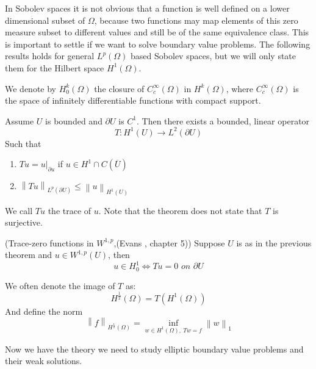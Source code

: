 \documentclass[../Main/main.tex]{subfiles}
\begin{document}
	In Sobolev spaces it is not obvious that a function is well defined on a lower dimensional subset of $\Omega$, because two functions may map elements of this zero measure subset to different values and still be of the same equivalence class. This is important to settle if we want to solve boundary value problems. The following results holds for general $L^p(\Omega)$ based Sobolev spaces, but we will only state them for the Hilbert space $H^1(\Omega)$.
	\begin{definition}
		We denote by $H_0^{k}(\Omega)$ the closure of $C_c^{\infty}(\Omega)$ in $H^{k}(\Omega)$, where $C_c^{\infty}(\Omega)$ is the space of infinitely differentiable functions with compact support.
	\end{definition}
	\begin{theorem}
		Assume $U$ is bounded and $\partial U$ is $C^1$. Then there exists a bounded, linear operator
		\begin{equation*}
			T: H^{1}(U) \rightarrow L^2(\partial U)
		\end{equation*}
		Such that
		\begin{enumerate}
			\item $ Tu = u|_{\partial u} $ if $u\in H^{1}\cap C(\overline{U})$
			\item $\left \|Tu\right\|_{L^p(\partial U)}\leq \left \| u \right \|_{H^{1}(U)}$
		\end{enumerate}
	\end{theorem}
	We call $Tu$ the trace of $u$. Note that the theorem does not state that $T$ is surjective.
	\begin{theorem}(Trace-zero functions in $W^{1,p}$,(Evans \cite{evans10}, chapter 5))
		Suppose $U$ is as in the previous theorem and $u\in W^{1,p}(U)$, then
		\begin{equation*}
			u\in H^{1}_0 \Leftrightarrow  Tu=0 \textit{ on }\partial U
		\end{equation*}
	\end{theorem}
	
	\begin{remark}
		We often denote the image of $T$ as:
		\begin{equation*}
			 H^{\frac{1}{2}}(\Omega) = T(H^1(\Omega))
		\end{equation*}
		And define the norm
		\begin{equation*}
			\left \|f\right \|_{H^{\frac{1}{2}}(\Omega)} = \inf_{w\in H^1(\Omega), \ Tw=f} \left \| w \right \|_1
		\end{equation*}
	\end{remark}
	Now we have the theory we need to study elliptic boundary value problems and their weak solutions.
\end{document}
